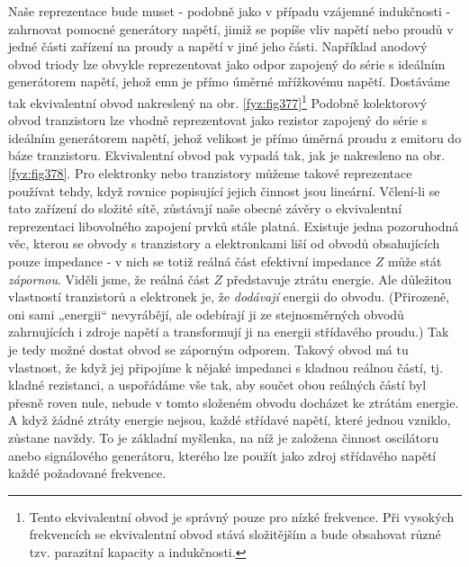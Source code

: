   Naše reprezentace bude muset - podobně jako v případu vzájemné indukčnosti - zahrnovat pomocné 
  generátory napětí, jimiž se popíše vliv napětí nebo proudů v jedné části zařízení na proudy a 
  napětí v jiné jeho části. Například anodový obvod triody lze obvykle reprezentovat jako odpor 
  zapojený do série s ideálním generátorem napětí, jehož emn je přímo úměrné mřížkovému napětí. 
  Dostáváme tak ekvivalentní obvod nakreslený na obr. \ref{fyz:fig377}\footnote{Tento ekvivalentní 
  obvod je správný pouze pro nízké frekvence. Při vysokých frekvencích se ekvivalentní obvod stává 
  složitějším a bude obsahovat různé tzv. parazitní kapacity a indukčnosti.} Podobně kolektorový 
  obvod tranzistoru lze vhodně reprezentovat jako rezistor zapojený do série s ideálním generátorem 
  napětí, jehož velikost je přímo úměrná proudu z emitoru do báze tranzistoru. Ekvivalentní
  obvod pak vypadá tak, jak je nakresleno na obr. \ref{fyz:fig378}. Pro elektronky nebo tranzistory 
  můžeme takové reprezentace používat tehdy, když rovnice popisující jejich činnost jsou lineární. 
  Včlení-li se tato zařízení do složité sítě, zůstávají naše obecné závěry o ekvivalentní 
  reprezentaci libovolného zapojení prvků stále platná. Existuje jedna pozoruhodná věc, kterou se 
  obvody s tranzistory a elektronkami liší od obvodů obsahujících pouze impedance - v nich se totiž 
  reálná část efektivní impedance \(Z\) může stát \emph{zápornou}. Viděli jsme, že reálná část 
  \(Z\) představuje ztrátu energie. Ale důležitou vlastností tranzistorů a elektronek je, že 
  \emph{dodávají} energii do obvodu. (Přirozeně, oni sami „energii“ nevyrábějí, ale odebírají ji ze 
  stejnosměrných obvodů zahrnujících i zdroje napětí a transformují ji na energii střídavého 
  proudu.) Tak je tedy možné dostat obvod se záporným odporem. Takový obvod má tu vlastnost, že 
  když jej připojíme k nějaké impedanci s kladnou reálnou částí, tj. kladné rezistanci, a 
  uspořádáme vše tak, aby součet obou reálných částí byl přesně roven nule, nebude v tomto složeném 
  obvodu docházet ke ztrátám energie. A když žádné ztráty energie nejsou, každé střídavé napětí, 
  které jednou vzniklo, zůstane navždy. To je základní myšlenka, na níž je založena činnost 
  oscilátoru anebo signálového generátoru, kterého lze použít jako zdroj střídavého napětí každé 
  požadované frekvence.
  
\printbibliography[title={Seznam literatury}, heading=subbibliography]
